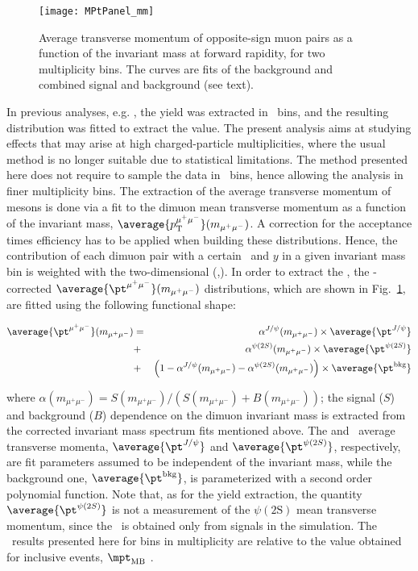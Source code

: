 \begin{figure}[htb]
  {\centering 
\texttt{[image: MPtPanel\_mm]}
\par}
\caption{\label{fig:mpt} Average transverse momentum of opposite-sign muon pairs as a function of the invariant mass at forward rapidity, for two multiplicity bins. The curves are fits of the background and combined signal and background (see text).}
\end{figure}

In previous analyses, e.g. \cite{Adam:2015ac}, the \jpsi yield was extracted in \pt ~bins, and the resulting distribution was fitted to extract the \mpt value. The present analysis aims at studying effects that may arise at high charged-particle multiplicities, where the usual method is no longer suitable due to statistical limitations. The method presented here does not require to sample the data in \pt ~bins, hence allowing the analysis in finer multiplicity bins. 
The extraction of the average transverse momentum of \jpsi mesons is done via a fit to the dimuon mean transverse momentum as a function of the invariant mass, $\average{p_{\rm{T}}^{\mu^{+}\mu^{-}}} (m_{\mu^{+}\mu^{-}})$.  A correction for the acceptance times efficiency has to be applied when building these distributions. Hence, the contribution of each dimuon pair with a certain \pt ~and $y$ in a given invariant mass bin is weighted with the two-dimensional \acef(\pt,\y). 
In order to extract the \jpsi \mpt, the \acef-corrected $\average{\pt^{\mu^{+}\mu^{-}}} (m_{\mu^{+} \mu^{-}})$ distributions, which are shown in Fig.~\ref{fig:mpt}, are fitted using the following functional shape:

\begin{eqnarray} \label{mptfitfcn}
\average{\pt^{\mu^{+} \mu^{-}}} (m_{\mu^{+} \mu^{-}}) &=& \alpha^{ J/\psi }(m_{\mu^{+} \mu^{-}}) \times \average{\pt^{J/\psi}}
\nonumber  \\
&+& \alpha^{ \psi(2S) }(m_{\mu^{+} \mu^{-}}) \times \average{\pt^{\psi(2S)}}
\nonumber  \\
&+& \left( 1 - \alpha^{J/\psi}(m_{\mu^{+} \mu^{-}}) -  \alpha^{\psi(2S)}(m_{\mu^{+} \mu^{-}}) \right) \times \average{\pt^{\mathrm{bkg}}}
\end{eqnarray}

where $\alpha(m_{\mu^{+} \mu^{-}}) = S(m_{\mu^{+} \mu^{-}}) / (S(m_{\mu^{+} \mu^{-}}) +B(m_{\mu^{+} \mu^{-}}))$; the signal ($S$) and background ($B$) dependence on the dimuon invariant mass is extracted from the corrected invariant mass spectrum fits mentioned above. The \jpsi and \psip ~average transverse momenta, $\average{\pt^{J/\psi}}$ and $\average{\pt^{\psi(2S)}}$, respectively, are fit parameters assumed to be independent of the invariant mass, while the background one, $\average{\pt^{\mathrm{bkg}}}$, is parameterized with a second order polynomial function. Note that, as for the yield extraction, the quantity $\average{\pt^{\psi(2S)}}$ is not a measurement of the $\psi(2\mathrm{S})$ mean transverse momentum, since the \acef ~is obtained only from \jpsi signals in the simulation. 
The \mpt ~results presented here for bins in multiplicity are relative to the value obtained for inclusive events, $\mpt_{\mathrm{MB}}$ \cite{Adam:2015ac}.
